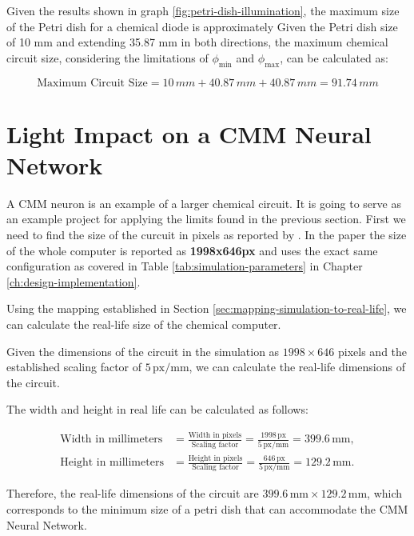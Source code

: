 Given the results shown in graph \ref{fig:petri-dish-illumination}, the maximum size of the Petri dish for a chemical diode is approximately 
Given the Petri dish size of 10 mm and extending 35.87 mm in both directions, the maximum chemical circuit size, considering the limitations of \( \phi_{\text{min}} \) and \( \phi_{\text{max}} \), can be calculated as:

\[ \text{Maximum Circuit Size} = 10\,mm + 40.87\,mm + 40.87\,mm = 91.74\,mm \]


\section{Light Impact on a CMM Neural Network \citep{stovold2017reaction}} \label{sec:light-impact-cmm-neuron}

A CMM neuron is an example of a larger chemical circuit. It is going to serve as an example project for applying the limits found in the previous section.
First we need to find the size of the curcuit in pixels as reported by \cite{stovold2017reaction}. In the paper the 
size of the whole computer is reported as \textbf{1998x646px} and uses the exact same configuration as covered in Table \ref{tab:simulation-parameters} in Chapter \ref{ch:design-implementation}.

Using the mapping established in Section \ref{sec:mapping-simulation-to-real-life}, we can calculate the real-life size of the chemical computer.


Given the dimensions of the circuit in the simulation as $1998 \times 646$ pixels and the established scaling factor of $5 \, \text{px/mm}$, we can calculate the real-life dimensions of the circuit.  

The width and height in real life can be calculated as follows:

\begin{align*}
    \text{Width in millimeters} &= \frac{\text{Width in pixels}}{\text{Scaling factor}} = \frac{1998 \, \text{px}}{5 \, \text{px/mm}} = 399.6 \, \text{mm}, \\
    \text{Height in millimeters} &= \frac{\text{Height in pixels}}{\text{Scaling factor}} = \frac{646 \, \text{px}}{5 \, \text{px/mm}} = 129.2 \, \text{mm}.
\end{align*}
    
Therefore, the real-life dimensions of the circuit are $399.6 \, \text{mm} \times 129.2 \, \text{mm}$, which corresponds to the minimum size of a petri dish that can accommodate the CMM Neural Network.


